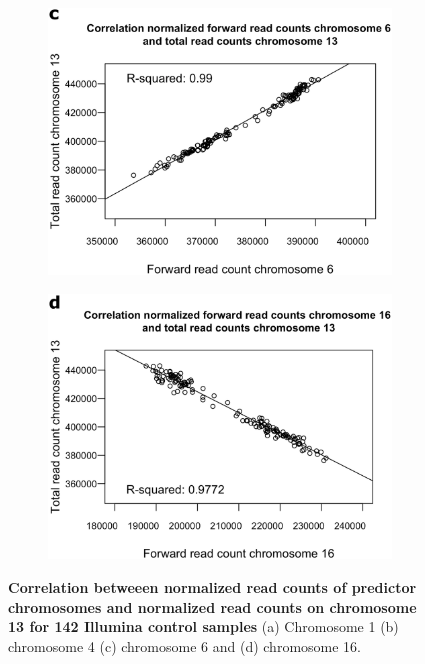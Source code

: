 \begin{figure}[h]
\begin{subfigure}{.5\textwidth}
		\includegraphics[width=1\linewidth]{img/NIPT_Supp3_Fig3_2c}
		\label{fig:NIPT_Supp3_Fig3_2c}
	\end{subfigure} 
	\begin{subfigure}{.5\textwidth}
		\centering
		\includegraphics[width=1\linewidth]{img/NIPT_Supp3_Fig3_2d}
		\label{fig:NIPT_Supp3_Fig3_2d}
	\end{subfigure}  
	\caption[Correlation between normalized read counts of chromosomes]{\textbf{Correlation betweeen normalized read counts of predictor chromosomes and normalized read counts on chromosome 13 for 142 Illumina control samples} (a) Chromosome 1 (b) chromosome 4 (c) chromosome 6 and (d) chromosome 16.}
	\label{fig:NIPT_Supp3_Fig3_2}
\end{figure}


